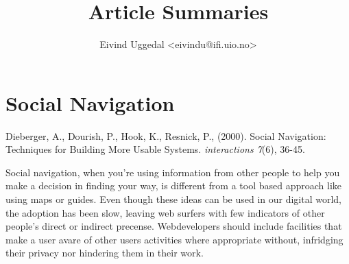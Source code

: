\documentclass[12pt,a4paper]{article}
\author{Eivind Uggedal <eivindu@ifi.uio.no>}
\title{Article Summaries}
\begin{document}
\maketitle{}

\section{Social Navigation}

Dieberger, A., Dourish, P., Hook, K., Resnick, P., (2000).
Social Navigation: Techniques for Building More Usable Systems.
\emph{interactions 7}(6), 36-45.
\break

Social navigation, when you're using information from other people to
help you make a decision in finding your way, is different from a tool based
approach like using maps or guides. Even though these ideas can be
used in our digital world, the adoption has been slow, leaving web surfers
with few indicators of other people's direct or indirect precense.
Webdevelopers should include facilities that make a user avare of other users
activities where appropriate without, infridging their privacy nor hindering
them in their work.
\end{document}
